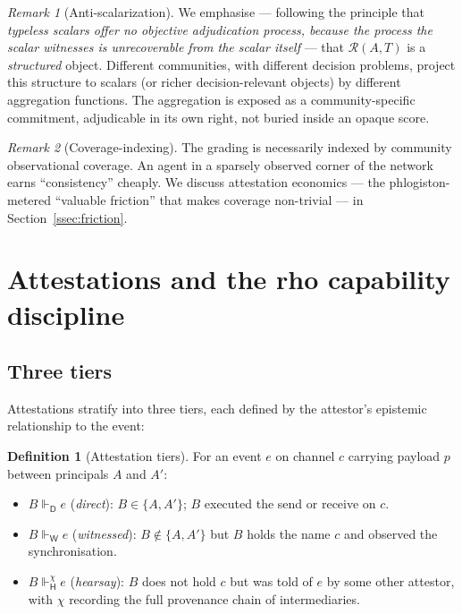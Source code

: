 \documentclass[11pt]{article}
\theoremstyle{definition}
\newtheorem{definition}{Definition}[section]
\theoremstyle{plain}
\theoremstyle{remark}
\newtheorem*{remark}{Remark}
\newcommand{\Att}{\mathrel{\Vdash}}
\newcommand{\AttD}{\Att_{\!\mathsf{D}}}
\newcommand{\AttW}{\Att_{\!\mathsf{W}}}
\newcommand{\AttH}{\Att_{\!\mathsf{H}}}
\newcommand{\Reps}{\mathcal{R}}
\begin{document}
\begin{remark}[Anti-scalarization]
We emphasise --- following the principle that \emph{typeless scalars offer no objective adjudication process, because the process the scalar witnesses is unrecoverable from the scalar itself} --- that $\Reps(A,T)$ is a \emph{structured} object. Different communities, with different decision problems, project this structure to scalars (or richer decision-relevant objects) by different aggregation functions. The aggregation is exposed as a community-specific commitment, adjudicable in its own right, not buried inside an opaque score.
\end{remark}

\begin{remark}[Coverage-indexing]
The grading is necessarily indexed by community observational coverage. An agent in a sparsely observed corner of the network earns ``consistency'' cheaply. We discuss attestation economics --- the phlogiston-metered ``valuable friction'' that makes coverage non-trivial --- in Section~\ref{ssec:friction}.
\end{remark}

\section{Attestations and the rho capability discipline}\label{sec:attest}

\subsection{Three tiers}

Attestations stratify into three tiers, each defined by the attestor's epistemic relationship to the event:

\begin{definition}[Attestation tiers]
For an event $e$ on channel $c$ carrying payload $p$ between principals $A$ and $A'$:
\begin{itemize}[leftmargin=*]
\item $B \AttD e$ (\emph{direct}): $B \in \{A, A'\}$; $B$ executed the send or receive on $c$.
\item $B \AttW e$ (\emph{witnessed}): $B \notin \{A,A'\}$ but $B$ holds the name $c$ and observed the synchronisation.
\item $B \AttH^{\chi} e$ (\emph{hearsay}): $B$ does not hold $c$ but was told of $e$ by some other attestor, with $\chi$ recording the full provenance chain of intermediaries.
\end{itemize}
\end{definition}
\end{document}
